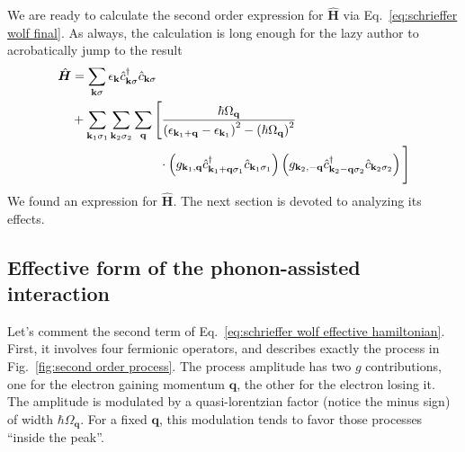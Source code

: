 We are ready to calculate the second order expression for $\hat{\bm H}$ via Eq.~\eqref{eq:schrieffer wolf final}. As always, the calculation is long enough for the lazy author to acrobatically jump to the result
\begin{equation}\label{eq:schrieffer wolf effective hamiltonian}
\begin{aligned}
	\hat{\bm H} &= \sum_{\mathbf{k}\sigma} \epsilon_{\mathbf{k}} \hat{c}_{\mathbf{k}\sigma}^\dagger \hat{c}_{\mathbf{k}\sigma} \\
	&+ \sum_{\mathbf{k}_1 \sigma_1} \sum_{\mathbf{k}_2 \sigma_2} \sum_\mathbf{q} \Bigg[ \frac{
		\hbar\Omega_\mathbf{q}
	}{
		\left({\epsilon_{\mathbf{k}_1+\mathbf{q}} - \epsilon_{\mathbf{k}_1}}\right)^2 - \left({\hbar\Omega_\mathbf{q}}\right)^2
	} \\
	&\hspace{7em} \cdot \left({g_{\mathbf{k}_1,\mathbf{q}} \hat{c}_{\mathbf{k}_1+\mathbf{q}\sigma_1}^\dagger \hat{c}_{\mathbf{k}_1\sigma_1} }\right)
	\left({g_{\mathbf{k}_2,-\mathbf{q}} \hat{c}_{\mathbf{k}_2-\mathbf{q}\sigma_2}^\dagger \hat{c}_{\mathbf{k}_2\sigma_2}}\right) \Bigg]
\end{aligned}
\end{equation}
We found an expression for $\hat{\bm H}$. The next section is devoted to analyzing its effects.

\subsection{Effective form of the phonon-assisted interaction}

Let's comment the second term of Eq.~\eqref{eq:schrieffer wolf effective hamiltonian}. First, it involves four fermionic operators, and describes exactly the process in Fig.~\ref{fig:second order process}. The process amplitude has two $g$ contributions, one for the electron gaining momentum $\mathbf{q}$, the other for the electron losing it. The amplitude is modulated by a quasi-lorentzian factor (notice the minus sign) of width $\hbar\Omega_\mathbf{q}$. For a fixed $\mathbf{q}$, this modulation tends to favor those processes ``inside the peak''.

